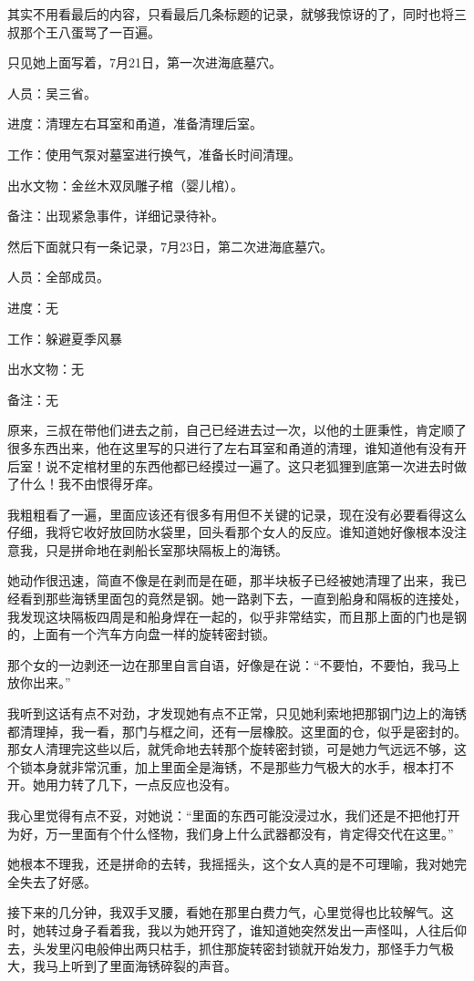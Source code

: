 其实不用看最后的内容，只看最后几条标题的记录，就够我惊讶的了，同时也将三叔那个王八蛋骂了一百遍。

只见她上面写着，7月21日，第一次进海底墓穴。

人员：吴三省。

进度：清理左右耳室和甬道，准备清理后室。

工作：使用气泵对墓室进行换气，准备长时间清理。

出水文物：金丝木双凤雕子棺（婴儿棺）。

备注：出现紧急事件，详细记录待补。

然后下面就只有一条记录，7月23日，第二次进海底墓穴。

人员：全部成员。

进度：无

工作：躲避夏季风暴

出水文物：无

备注：无

原来，三叔在带他们进去之前，自己已经进去过一次，以他的土匪秉性，肯定顺了很多东西出来，他在这里写的只进行了左右耳室和甬道的清理，谁知道他有没有开后室！说不定棺材里的东西他都已经摸过一遍了。这只老狐狸到底第一次进去时做了什么！我不由恨得牙痒。

我粗粗看了一遍，里面应该还有很多有用但不关键的记录，现在没有必要看得这么仔细，我将它收好放回防水袋里，回头看那个女人的反应。谁知道她好像根本没注意我，只是拼命地在剥船长室那块隔板上的海锈。

她动作很迅速，简直不像是在剥而是在砸，那半块板子已经被她清理了出来，我已经看到那些海锈里面包的竟然是钢。她一路剥下去，一直到船身和隔板的连接处，我发现这块隔板四周是和船身焊在一起的，似乎非常结实，而且那上面的门也是钢的，上面有一个汽车方向盘一样的旋转密封锁。

那个女的一边剥还一边在那里自言自语，好像是在说：“不要怕，不要怕，我马上放你出来。”

我听到这话有点不对劲，才发现她有点不正常，只见她利索地把那钢门边上的海锈都清理掉，我一看，那门与框之间，还有一层橡胶。这里面的仓，似乎是密封的。那女人清理完这些以后，就凭命地去转那个旋转密封锁，可是她力气远远不够，这个锁本身就非常沉重，加上里面全是海锈，不是那些力气极大的水手，根本打不开。她用力转了几下，一点反应也没有。

我心里觉得有点不妥，对她说：“里面的东西可能没浸过水，我们还是不把他打开为好，万一里面有个什么怪物，我们身上什么武器都没有，肯定得交代在这里。”

她根本不理我，还是拼命的去转，我摇摇头，这个女人真的是不可理喻，我对她完全失去了好感。

接下来的几分钟，我双手叉腰，看她在那里白费力气，心里觉得也比较解气。这时，她转过身子看着我，我以为她开窍了，谁知道她突然发出一声怪叫，人往后仰去，头发里闪电般伸出两只枯手，抓住那旋转密封锁就开始发力，那怪手力气极大，我马上听到了里面海锈碎裂的声音。

